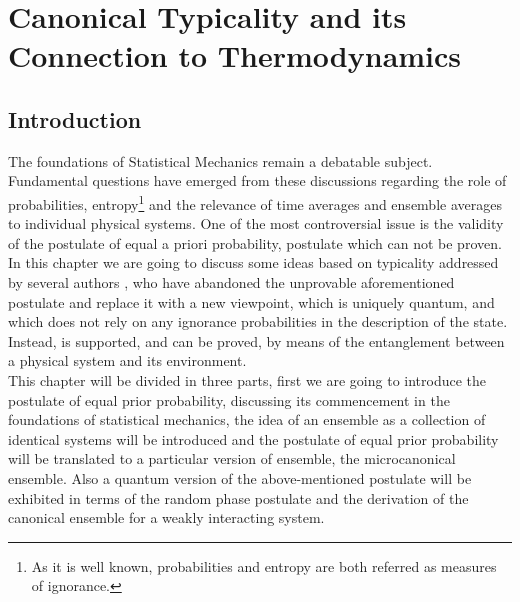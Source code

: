 \chapter{Canonical Typicality and its Connection to Thermodynamics}
\section{Introduction}

The foundations of Statistical Mechanics remain a debatable subject. Fundamental questions have emerged from these discussions regarding the role of probabilities, entropy\footnote{As it is well known, probabilities and entropy are both referred as measures of ignorance.} and the relevance of time averages and ensemble averages to individual physical systems. One of the most controversial issue is the validity of the postulate of equal a priori probability, postulate which can not be proven. \\

\indent In this chapter we are going to discuss some ideas based on typicality addressed by several authors \cite{gemmer_quantum_2004, goldstein_canonical_2006, popescu_entanglement_2006}, who have abandoned the unprovable aforementioned postulate and replace it with a new viewpoint, which is uniquely quantum, and which does not rely on any ignorance probabilities in the description of the state. Instead, is supported, and can be proved, by means of the entanglement between a physical system and its environment.\\ 

\indent This chapter will be divided in three parts, first we are going to introduce the postulate of equal prior probability, discussing its commencement in the foundations of statistical mechanics, the idea of an ensemble as a collection of identical systems will be introduced and the postulate of equal prior probability will be translated  to a particular version of ensemble, the microcanonical ensemble. Also a quantum version of the above-mentioned postulate will be exhibited in terms of the random phase postulate \cite{landau_statistical_2013} and the derivation of the canonical ensemble for a weakly interacting system.\\


